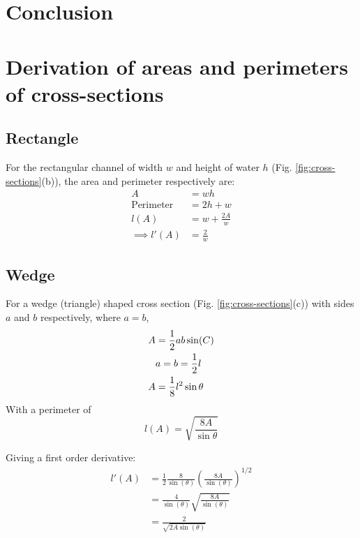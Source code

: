 \documentclass[12pt]{article}
\begin{document}
\section{Conclusion}
\newpage



\newpage
\appendix
\section{Derivation of areas and perimeters of cross-sections}
\subsection{Rectangle}
\label{appendix:rectangle}
For the rectangular channel of width $w$ and height of water $h$ (Fig. \ref{fig:cross-sections}(b)), the area and perimeter respectively are:
\begin{equation}
    \begin{split}
        A &= wh
        \\\text{Perimeter}&=2h + w
        \\l(A) &= w + \frac{2A}{w}
        \\\implies l'(A) &= \frac{2}{w}
    \end{split}
\end{equation}

\subsection{Wedge}
\label{appendix:wedge}
For a wedge (triangle) shaped cross section (Fig. \ref{fig:cross-sections}(c)) with sides $a$ and $b$ respectively, where $a = b$,
\begin{align}
    A &= \frac{1}{2}ab\sin(C) \notag
    \\&a = b = \frac{1}{2}l \notag
    \\A &= \frac{1}{8}l^2\sin{\theta}
\end{align}
With a perimeter of 
\begin{equation}
    l(A) = \sqrt{\frac{8A}{\sin{\theta}}}
\end{equation}

Giving a first order derivative:
\begin{equation}
    \begin{split}
          l'(A) &= \frac{1}{2}\frac{8}{\sin(\theta)}\left(\frac{8A}{\sin(\theta)}\right)^{1/2}
          \\&=\frac{4}{\sin(\theta)}\sqrt{\frac{8A}{\sin(\theta)}}
          \\&=\frac{2}{\sqrt{2A\sin(\theta)}}
    \end{split}
\end{equation}
\end{document}
